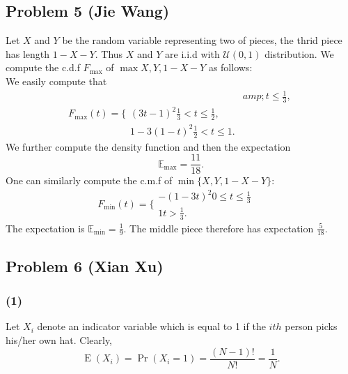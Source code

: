 \documentclass[10pt]{article}
\begin{document}
\subsection*{Problem 5 (Jie Wang)}
Let $X$ and $Y$ be the random variable representing two of pieces, the thrid piece has length $1 -X -Y$. Thus $X$ and $Y$ are i.i.d with $\mathcal{U} (0 ,1)$ distribution. We compute the c.d.f $F_{\max }$ of $\max X ,Y ,1 -X -Y$ as follows: 
\begin{equation*}
\end{equation*}  We easily compute that \begin{equation*}F_{\max } (t) =\{\begin{array}{ll}\, & a m p ;t
\le
\frac{1}{3}\text{,} \\
(3 t -1)^{2} \frac{1}{3} <t
\le
\frac{1}{2}\text{,} & \, \\
1 -3 (1 -t)^{2} \frac{1}{2} <t
\le
1. & \,\end{array}
\end{equation*} We further compute the density function and then the expectation \begin{equation*}\mathbb{E}_{\max } =\frac{11}{18}\text{.}
\end{equation*} One can similarly compute the c.m.f of $\min \{X ,Y ,1 -X -Y\}$: \begin{equation*}F_{\min } (t) =\{\begin{array}{ll} -(1 -3 t)^{2} 0
\le
t
\le
\frac{1}{3} & \, \\
1 t >\frac{1}{3}\text{.} & \,\end{array}
\end{equation*} The expectation is $\mathbb{E}_{\min } =\frac{1}{9}$. The middle piece therefore has expectation $\frac{5}{18}$.

\subsection*{Problem 6 (Xian Xu)}

\subsubsection*{(1)}
Let $X_{i}$ denote an indicator variable which is equal to 1 if the $i t h$ person picks his/her own hat. Clearly, 
\begin{equation*}\;\text{E}\;(X_{i}) =\;\text{Pr}\;(X_{i} =1) =\frac{(N -1) !}{N !} =\frac{1}{N}\text{.}
\end{equation*}
\end{document}
